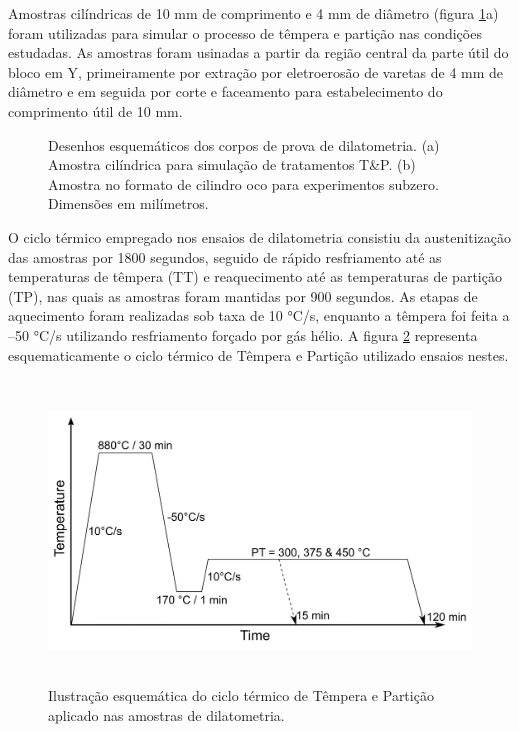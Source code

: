 Amostras cilíndricas de 10 mm de comprimento e 4 mm de diâmetro (figura \ref{fig:CPdil}a) foram utilizadas para simular o processo de têmpera e partição nas condições estudadas. As amostras foram usinadas a partir da região central da parte útil do bloco em Y, primeiramente por extração por eletroerosão de varetas de 4 mm de diâmetro e em seguida por corte e faceamento para estabelecimento do comprimento útil de 10 mm.

\begin{figure}
	\hspace{5em}
	\caption{Desenhos esquemáticos dos corpos de prova de dilatometria. (a) Amostra cilíndrica para simulação de tratamentos T\&P. (b) Amostra no formato de cilindro oco para experimentos subzero. Dimensões em milímetros.}
	\label{fig:CPdil}
\end{figure}

O ciclo térmico empregado nos ensaios de dilatometria consistiu da austenitização das amostras por 1800 segundos, seguido de rápido resfriamento até as temperaturas de têmpera (TT) e reaquecimento até as temperaturas de partição (TP), nas quais as amostras foram mantidas por 900 segundos. As etapas de aquecimento foram realizadas sob taxa de 10 °C/s, enquanto a têmpera foi feita a --50 °C/s utilizando resfriamento forçado por gás hélio. A figura \ref{fig:expDil} representa esquematicamente o ciclo térmico de Têmpera e Partição utilizado ensaios nestes.

\begin{figure}
	\includegraphics[height=8cm]{img/expproc_dil.png}
	\caption{Ilustração esquemática do ciclo térmico de Têmpera e Partição aplicado nas amostras de dilatometria.}
	\label{fig:expDil}
\end{figure}

